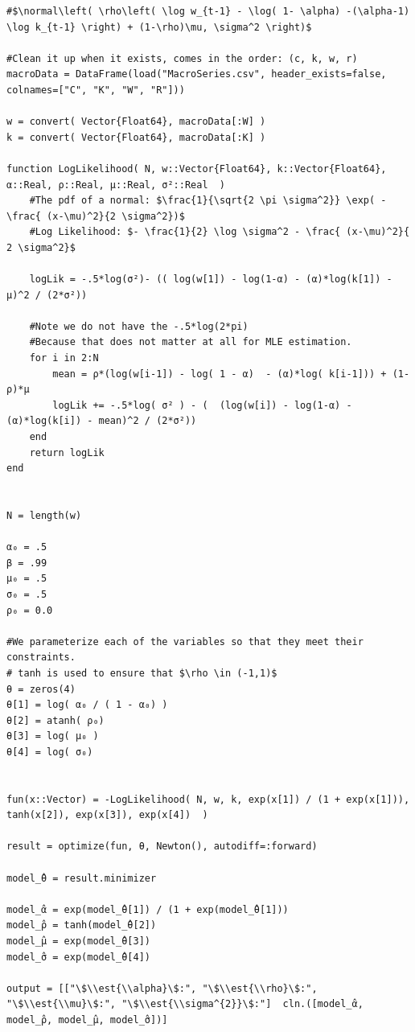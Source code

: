 \documentclass[12pt, letterpaper]{paper}
\begin{document}
\begin{verbatim}
#$\normal\left( \rho\left( \log w_{t-1} - \log( 1- \alpha) -(\alpha-1) \log k_{t-1} \right) + (1-\rho)\mu, \sigma^2 \right)$

#Clean it up when it exists, comes in the order: (c, k, w, r)
macroData = DataFrame(load("MacroSeries.csv", header_exists=false, colnames=["C", "K", "W", "R"]))

w = convert( Vector{Float64}, macroData[:W] )
k = convert( Vector{Float64}, macroData[:K] )

function LogLikelihood( N, w::Vector{Float64}, k::Vector{Float64}, α::Real, ρ::Real, μ::Real, σ²::Real  )
    #The pdf of a normal: $\frac{1}{\sqrt{2 \pi \sigma^2}} \exp( - \frac{ (x-\mu)^2}{2 \sigma^2})$
    #Log Likelihood: $- \frac{1}{2} \log \sigma^2 - \frac{ (x-\mu)^2}{ 2 \sigma^2}$

    logLik = -.5*log(σ²)- (( log(w[1]) - log(1-α) - (α)*log(k[1]) - μ)^2 / (2*σ²))

    #Note we do not have the -.5*log(2*pi)
    #Because that does not matter at all for MLE estimation.
    for i in 2:N
        mean = ρ*(log(w[i-1]) - log( 1 - α)  - (α)*log( k[i-1])) + (1-ρ)*μ
        logLik += -.5*log( σ² ) - (  (log(w[i]) - log(1-α) - (α)*log(k[i]) - mean)^2 / (2*σ²))
    end
    return logLik
end


N = length(w)

α₀ = .5
β = .99
μ₀ = .5
σ₀ = .5
ρ₀ = 0.0

#We parameterize each of the variables so that they meet their constraints.
# tanh is used to ensure that $\rho \in (-1,1)$
θ = zeros(4)
θ[1] = log( α₀ / ( 1 - α₀) )
θ[2] = atanh( ρ₀)
θ[3] = log( μ₀ )
θ[4] = log( σ₀)


fun(x::Vector) = -LogLikelihood( N, w, k, exp(x[1]) / (1 + exp(x[1])), tanh(x[2]), exp(x[3]), exp(x[4])  )

result = optimize(fun, θ, Newton(), autodiff=:forward)

model_̂θ = result.minimizer

model_̂α = exp(model_̂θ[1]) / (1 + exp(model_̂θ[1]))
model_̂ρ = tanh(model_̂θ[2])
model_̂μ = exp(model_̂θ[3])
model_̂σ = exp(model_̂θ[4])

output = [["\$\\est{\\alpha}\$:", "\$\\est{\\rho}\$:", "\$\\est{\\mu}\$:", "\$\\est{\\sigma^{2}}\$:"]  cln.([model_̂α, model_̂ρ, model_̂μ, model_̂σ])]
\end{verbatim}
\end{document}
